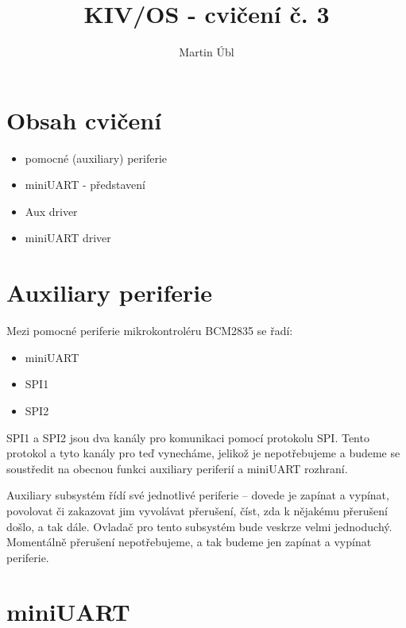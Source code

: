 \documentclass{article}
\author{Martin Úbl}
\title{KIV/OS - cvičení č. 3}
\begin{document}
\maketitle



\section{Obsah cvičení}

\begin{itemize}
	\item pomocné (auxiliary) periferie
	\item miniUART - představení
	\item Aux driver
	\item miniUART driver
\end{itemize}


\section{Auxiliary periferie}

Mezi pomocné periferie mikrokontroléru BCM2835 se řadí:
\begin{itemize}
	\item miniUART
	\item SPI1
	\item SPI2
\end{itemize}

SPI1 a SPI2 jsou dva kanály pro komunikaci pomocí protokolu SPI. Tento protokol a tyto kanály pro teď vynecháme, jelikož je nepotřebujeme a budeme se soustředit na obecnou funkci auxiliary periferií a miniUART rozhraní.

Auxiliary subsystém řídí své jednotlivé periferie -- dovede je zapínat a vypínat, povolovat či zakazovat jim vyvolávat přerušení, číst, zda k nějakému přerušení došlo, a tak dále. Ovladač pro tento subsystém bude veskrze velmi jednoduchý. Momentálně přerušení nepotřebujeme, a tak budeme jen zapínat a vypínat periferie.

\section{miniUART}
\end{document}
